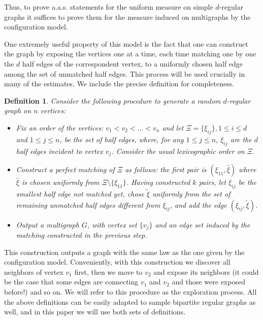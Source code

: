 \documentclass[11pt,reqno]{amsart}
\newtheorem{definition}{Definition}
\begin{document}
Thus, to prove a.a.s. statements for the uniform measure on simple $d$-regular graphs it suffices to prove them for the measure induced on multigraphs by the configuration model.

One extremely useful property of this model is the fact that one can construct the graph by exposing the vertices one at a time, each time matching one by one the $d$ half edges of the correspondent vertex, to a uniformly chosen half edge among the set of unmatched half edges. This process will be used crucially in many of the estimates. We include the precise definition for completeness.  
\begin{definition}\label{conf_process}
Consider the following procedure to generate a random $d$-regular graph on $n$ vertices:
 \begin{itemize}
   \item[$-$] Fix an order of the vertices: $v_1< v_2<...< v_n$ and let $\Xi=\{\xi_{ij}\}, 1\leq i\leq d$ and $1\leq j\leq n$, be the set of half edges, where, for any $1\leq j\leq n$, $\xi_{ij}$ are the $d$ half edges incident to vertex $v_j$. Consider the usual lexicographic order on $\Xi$. 
 	 \item[$-$] Construct a perfect matching of $\Xi$ as follows:
           the first pair is $(\xi_{11},\hat{\xi})$ where
           $\hat{\xi}$ is chosen uniformly from $\Xi \setminus
           \{\xi_{11}\}$. Having constructed $k$ pairs, let
           $\xi_{ij}$ be the smallest half edge not matched yet, chose
           $\tilde{\xi}$ uniformly from the set of remaining unmatched
           half edges different from $\xi_{ij}$, and add the edge
           $(\xi_{ij},\tilde{\xi})$.
	 \item[$-$] Output a multigraph $G$, with vertex set $\{v_j\}$ and an edge set induced by the matching constructed in the previous step.
 \end{itemize}
\end{definition}

This construction outputs a graph with the same law as the one given by the configuration model. Conveniently, with this construction we discover all neighbors of vertex $v_1$ first, then we move to $v_2$ and expose its neighbors (it could be the case that some edges are connecting $v_1$ and $v_2$ and those were exposed before!) and so on.  We will refer to this procedure as the exploration process. 
All the above definitions can be easily adapted to  sample bipartite
regular graphs as well, and in this paper we will use both sets of definitions. 
\end{document}
